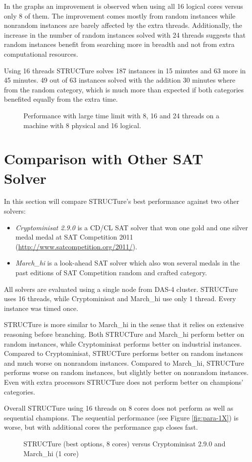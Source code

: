 In the graphs an improvement is observed when using all 16 logical
cores versus only 8 of them. The improvement comes mostly from
random instances while nonrandom instances are barely affected
by the extra threads.  Additionally, the increase in the number
of random instances solved with 24 threads suggests that random
instances benefit from searching more in breadth and not from extra
computational resources.

Using 16 threads STRUCTure solves 187 instances in 15 minutes and 63
more in 45 minutes. 49 out of 63 instances solved with the addition
30 minutes where from the random category, which is much more than
expected if both categories benefited equally from the extra time.

\begin{figure}
  \centering
  \caption{Performance with large time limit with 8, 16 and 24
  threads on a machine with 8 physical and 16 logical.}
  \label{fig:large}
\end{figure}


\section{Comparison with Other SAT Solver}

In this section will compare STRUCTure's best performance against
two other solvers:
\begin{itemize}
  \item \emph{Cryptominisat 2.9.0} \cite{mine:cryptominisat} is a
  CD/CL SAT solver that won one gold and one silver medal medal at
  SAT Competition 2011 (\url{http://www.satcompetition.org/2011/}).

  \item \emph{March\_hi} \cite{mine:march-hi} is a look-ahead SAT
  solver which also won several medals in the past editions of SAT
  Competition random and crafted category.
\end{itemize}

All solvers are evaluated using a single node from DAS-4 cluster.
STRUCTure uses 16 threads, while Cryptominisat and March\_hi
use only 1 thread. Every instance was timed once.

STRUCTure is more similar to March\_hi in the sense that it relies on
extensive reasoning before branching. Both STRUCTure and March\_hi
perform better on random instances, while Cryptominisat performs
better on industrial instances.  Compared to Cryptominisat, STRUCTure
performs better on random instances and much worse on nonrandom
instances. Compared to March\_hi, STRUCTure performs worse on random
instances, but slightly better on nonrandom instances. Even with
extra processors STRUCTure does not perform better on champions'
categories.

Overall STRUCTure using 16 threads on 8 cores does not perform
as well as sequential champions. The sequential performance (see
Figure \ref{fig:para-1X}) is worse, but with additional cores the
performance gap closes fast.


\begin{figure}
  \centering
  \caption{STRUCTure (best options, 8 cores) versus Cryptominisat
  2.9.0 and March\_hi (1 core)}
  \label{fig:compare}
\end{figure}
